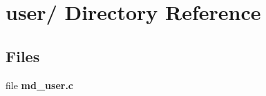 \section{user/ Directory Reference}
\label{dir_91b4c9e6726b42d4d3a0cc502537fd5a}
\subsection*{Files}
\begin{CompactItemize}
\item 
file {\bf md\_\-user.c}
\end{CompactItemize}
